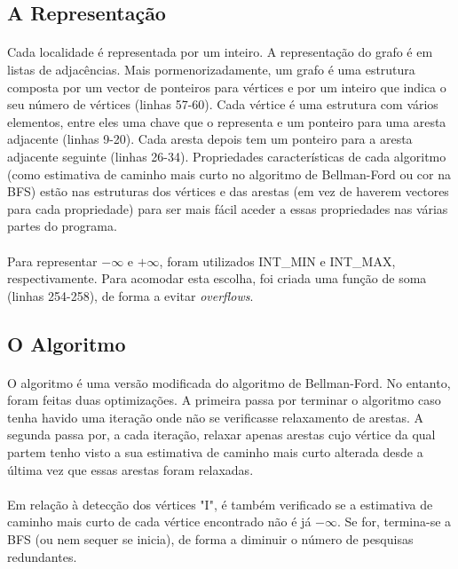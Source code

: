 \documentclass[12pt, a4paper]{article}
\begin{document}
\subsection{A Representação}
\paragraph{}
Cada localidade é representada por um inteiro. A representação do grafo é em
listas de adjacências. Mais pormenorizadamente, um grafo é uma estrutura
composta por um vector de ponteiros para vértices e por um inteiro que indica o
seu número de vértices (linhas 57-60). Cada vértice é uma estrutura com vários
elementos, entre eles uma chave que o representa e um ponteiro para uma aresta
adjacente (linhas 9-20). Cada aresta depois tem um ponteiro para a aresta
adjacente seguinte (linhas 26-34). Propriedades características de cada
algoritmo (como estimativa de caminho mais curto no algoritmo de Bellman-Ford ou
cor na BFS) estão nas estruturas dos vértices e das arestas (em vez de haverem
vectores para cada propriedade) para ser mais fácil aceder a essas propriedades
nas várias partes do programa.
\paragraph{}
Para representar $-\infty$ e $+\infty$, foram utilizados INT\_MIN e INT\_MAX,
respectivamente. Para acomodar esta escolha, foi criada uma função de soma
(linhas 254-258), de forma a evitar \textit{overflows}.

\subsection{O Algoritmo}
\paragraph{}
O algoritmo é uma versão modificada do algoritmo de Bellman-Ford. No entanto,
foram feitas duas optimizações. A primeira passa por terminar o algoritmo caso
tenha havido uma iteração onde não se verificasse relaxamento de arestas. A
segunda passa por, a cada iteração, relaxar apenas arestas cujo vértice da qual
partem tenho visto a sua estimativa de caminho mais curto alterada desde a
última vez que essas arestas foram relaxadas.
\paragraph{}
Em relação à detecção dos vértices "I", é também verificado se a estimativa de
caminho mais curto de cada vértice encontrado não é já $-\infty$.  Se for,
termina-se a BFS (ou nem sequer se inicia), de forma a diminuir o número de
pesquisas redundantes.
\end{document}
